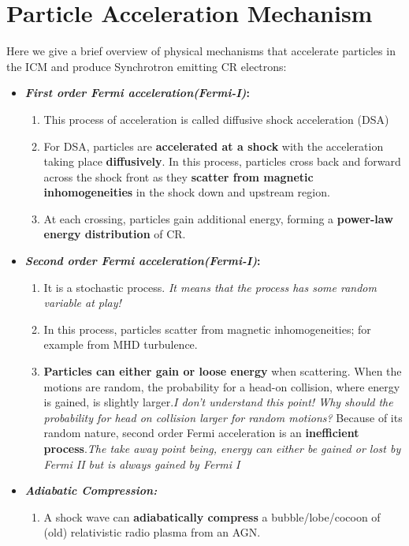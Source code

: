 \documentclass[11pt]{report}
\newcommand{\tbf}[1]{\textbf{#1}}
\newcommand{\tit}[1]{\textit{#1}}
\begin{document}
 \section{Particle Acceleration Mechanism}
 Here we give a brief overview of physical mechanisms that accelerate particles in the ICM and produce Synchrotron emitting CR electrons:
 \begin{itemize}
 
 \item \tbf{\tit{First order Fermi acceleration(Fermi-I)}:}
 \begin{enumerate}
 \item This process of acceleration is called  diffusive shock acceleration (DSA)\\
 \item  For DSA, particles are \tbf{accelerated at a shock} with the acceleration taking place \tbf{diffusively}. In this process, particles cross back and forward across the shock front as they \tbf{scatter from magnetic inhomogeneities} in the shock down and upstream region. 
 \item At each crossing, particles gain additional energy, forming a \tbf{power-law energy distribution} of CR.
 \end{enumerate}
 \item \tbf{\tit{Second order Fermi acceleration(Fermi-I)}:}
 \begin{enumerate}
 \item It is a stochastic process. \tit{It means that the process has some random variable at play!}
 \item In this process, particles scatter from magnetic inhomogeneities; for example from MHD turbulence.
 \item  \textbf{Particles can either gain or loose energy} when scattering. When the motions are random, the probability for a head-on collision, where energy is gained, is slightly larger.\tit{I don't understand this point! Why should the probability for head on collision larger for random motions?} Because of its random nature, second order Fermi acceleration is an \tbf{inefficient process}.\tit{The take away point being, energy can either be gained or lost by Fermi II but is always gained by Fermi I }
 \end{enumerate}
 \item \tit{\tbf{Adiabatic Compression:}}
 \begin{enumerate}
 \item A shock wave can \tbf{adiabatically compress} a bubble/lobe/cocoon of (old) relativistic radio plasma from an AGN.
 

\end{enumerate}
\end{itemize}
\end{document}
